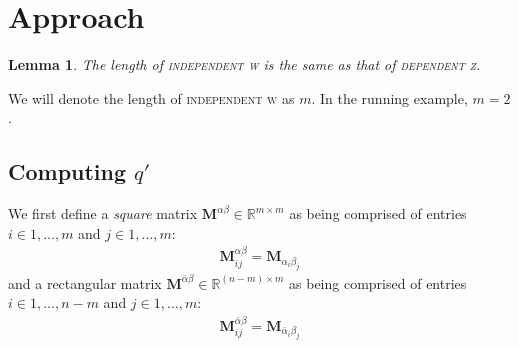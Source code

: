 \documentclass{article}
\newtheorem{lemma}{Lemma}
\providecommand{\mat}[1]{\mathbf#1}
\newcommand{\1}{(\textos{1})\!}
\newcommand{\2}{(\textos{2})\!}
\newcommand{\3}{(\textos{3})\!}
\newcommand{\4}{(\textos{4})\!}
\newcommand{\5}{(\textos{5})\!}
\newcommand{\6}{(\textos{6})\!}
\newcommand{\7}{(\textos{7})\!}
\newcommand{\8}{(\textos{8})\!}
\begin{document}
\section{Approach}
\begin{lemma}
	The length of \textsc{independent w} is the same as that of \textsc{dependent z}.
\end{lemma}
We will denote the length of \textsc{independent w} as $m$. In the running example, $m = 2$.
\subsection{Computing $q'$}
We first define a \textit{square} matrix $\mat{M}^{\alpha\beta} \in\mathbb{R}^{m \times m}$ as being comprised of entries $i \in 1,\ldots,m$ and $j \in 1, \ldots, m$:
\begin{align*}
	\mat{M}^{\alpha\beta}_{ij} = \mat{M}_{\alpha_i\beta_j}
\end{align*}
and a rectangular matrix $\mat{M}^{\bar{\alpha}\beta} \in\mathbb{R}^{(n-m)\times m}$ as being comprised of entries $i \in 1,\ldots,n-m$ and $j \in 1, \ldots, m$:
\begin{align*}
	\mat{M}^{\bar{\alpha}\beta}_{ij} = \mat{M}_{\bar{\alpha}_i\beta_j}
\end{align*}
\end{document}
